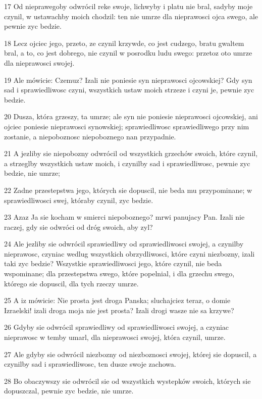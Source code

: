 \par 17 Od nieprawegoby odwrócil reke swoje, lichwyby i platu nie bral, sadyby moje czynil, w ustawachby moich chodzil: ten nie umrze dla nieprawosci ojca swego, ale pewnie zyc bedzie.
\par 18 Lecz ojciec jego, przeto, ze czynil krzywde, co jest cudzego, bratu gwaltem bral, a to, co jest dobrego, nie czynil w posrodku ludu swego: przetoz oto umrze dla nieprawosci swojej.
\par 19 Ale mówicie: Czemuz? Izali nie poniesie syn nieprawosci ojcowskiej? Gdy syn sad i sprawiedliwosc czyni, wszystkich ustaw moich strzeze i czyni je, pewnie zyc bedzie.
\par 20 Dusza, która grzeszy, ta umrze; ale syn nie poniesie nieprawosci ojcowskiej, ani ojciec poniesie nieprawosci synowskiej; sprawiedliwosc sprawiedliwego przy nim zostanie, a niepoboznosc niepoboznego nan przypadnie.
\par 21 A jezliby sie niepobozny odwrócil od wszystkich grzechów swoich, które czynil, a strzeglby wszystkich ustaw moich, i czynilby sad i sprawiedliwosc, pewnie zyc bedzie, nie umrze;
\par 22 Zadne przestepstwa jego, których sie dopuscil, nie beda mu przypominane; w sprawiedliwosci swej, któraby czynil, zyc bedzie.
\par 23 Azaz Ja sie kocham w smierci niepoboznego? mrwi panujacy Pan. Izali nie raczej, gdy sie odwróci od dróg swoich, aby zyl?
\par 24 Ale jezliby sie odwrócil sprawiedliwy od sprawiedliwosci swojej, a czynilby nieprawosc, czyniac wedlug wszystkich obrzydliwosci, które czyni niezbozny, izali taki zyc bedzie? Wszystkie sprawiedliwosci jego, które czynil, nie beda wspominane; dla przestepstwa swego, które popelnial, i dla grzechu swego, którego sie dopuscil, dla tych rzeczy umrze.
\par 25 A iz mówicie: Nie prosta jest droga Panska; sluchajciez teraz, o domie Izraelski! izali droga moja nie jest prosta? Izali drogi wasze nie sa krzywe?
\par 26 Gdyby sie odwrócil sprawiedliwy od sprawiedliwosci swojej, a czyniac nieprawosc w temby umarl, dla nieprawosci swojej, która czynil, umrze.
\par 27 Ale gdyby sie odwrócil niezbozny od niezboznosci swojej, której sie dopuscil, a czynilby sad i sprawiedliwosc, ten dusze swoje zachowa.
\par 28 Bo obaczywszy sie odwrócil sie od wszystkich wystepków swoich, których sie dopuszczal, pewnie zyc bedzie, nie umrze.
